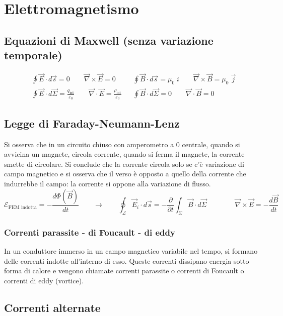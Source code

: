 \documentclass[a4paper]{article}
\newcommand\nab{\vec{\nabla}} %
\begin{document}
\section{Elettromagnetismo}
\subsection{Equazioni di Maxwell (senza variazione temporale)}
\begin{align*}
	&\oint \vec{E} \cdot d\vec{s} = 0 \qquad \nab \times \vec{E} = 0 &&\oint \vec{B} \cdot d\vec{s} = \mu_0 \; i \qquad \nab \times \vec{B} = \mu_0 \; \vec{j} \\[10pt]
	&\oint \vec{E} \cdot d\vec{\Sigma} = \frac{q_\text{int}}{\varepsilon_0} \qquad \nab \cdot \vec{E} = \frac{\rho_\text{int}}{\varepsilon_0} &&\oint \vec{B} \cdot d\vec{\Sigma} = 0 \qquad \nab \cdot \vec{B} = 0
\end{align*}

\subsection{Legge di Faraday-Neumann-Lenz}
Si osserva che in un circuito chiuso con amperometro a 0 centrale, quando si avvicina un magnete, circola corrente, quando si
ferma il magnete, la corrente smette di circolare. Si conclude che la corrente circola solo se c'è variazione di campo magnetico
e si osserva che il verso è opposto a quello della corrente che indurrebbe il campo: la corrente si oppone alla variazione di
flusso.
\[\mathcal{E}_\text{FEM indotta} = -\frac{d \Phi(\vec{B})}{dt} \qquad \rightarrow \qquad \oint_\mathcal{L} \vec{E}_i \cdot d\vec{s} = -\frac{\partial}{\partial t}\int_\Sigma \vec{B} \cdot d\vec{\Sigma} \qquad\qquad \nab \times \vec{E} = -\frac{d\vec{B}}{dt}\]

\subsubsection*{Correnti parassite - di Foucault - di eddy}
In un conduttore immerso in un campo magnetico variabile nel tempo, si formano delle correnti indotte all'interno di esso. Queste
correnti dissipano energia sotto forma di calore e vengono chiamate correnti parassite o correnti di Foucault o correnti di eddy
(vortice).

\subsection{Correnti alternate}
\end{document}
